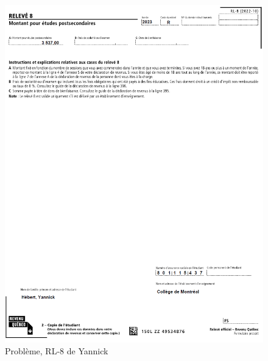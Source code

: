 \begin{figure}
	\centering
	\includegraphics[width=.9\textwidth]{probleme/chapitre-4/Yannick-RL8.png}
	\caption[]{Problème, RL-8 de Yannick}
	\label{fig:chap4ProblemeYannickRL8}
\end{figure}


